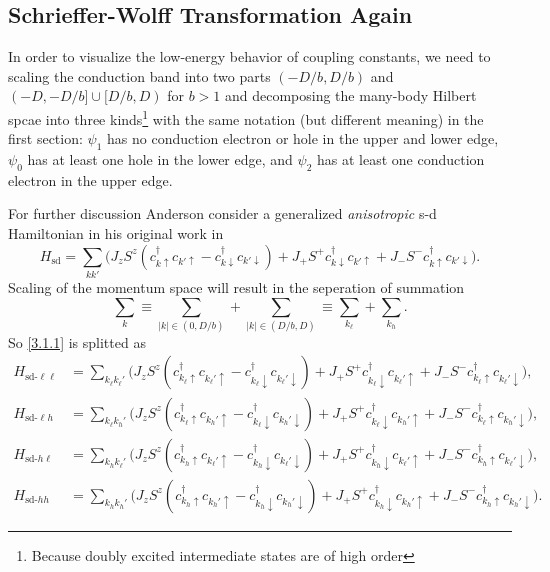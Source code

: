 \documentclass[aps,prx,superscriptaddress,onecolumn,preprintnumbers,nofootinbib,longbibliography]{revtex4-1}
\begin{document}
	\subsection{Schrieffer-Wolff Transformation Again}
		In order to visualize the low-energy behavior of coupling constants, we need to scaling the conduction band into two parts $(-D/b,D/b)$ and $(-D,-D/b]\cup[D/b,D)$ for $b>1$ and decomposing the many-body Hilbert spcae into three kinds\footnote{Because doubly excited intermediate states are of high order} with the same notation (but different meaning) in the first section: $\psi_1$ has no conduction electron or hole in the upper and lower edge, $\psi_0$ has at least one hole in the lower edge, and $\psi_2$ has at least one conduction electron in the upper edge.\par
		For further discussion Anderson consider a generalized \emph{anisotropic} s-d Hamiltonian in his original work in \cite{anderson1970poor}
		\begin{equation}\label{3.1.1}
			H_{\text{sd}}=\sum_{kk'}\bigg(J_zS^z(c_{k\uparrow}^\dagger c_{k'\uparrow}-c_{k\downarrow}^\dagger c_{k'\downarrow})+J_+S^+c_{k\downarrow}^\dagger c_{k'\uparrow}+J_-S^-c_{k\uparrow}^\dagger c_{k'\downarrow}\bigg).
		\end{equation}
		Scaling of the momentum space will result in the seperation of summation
		\begin{equation*}
			\sum_k\equiv\sum_{|k|\in(0,D/b)}+\sum_{|k|\in(D/b,D)}\equiv\sum_{k_\ell}+\sum_{k_h}.
		\end{equation*}
		So \eqref{3.1.1} is splitted as
		\begin{align*}
			H_{\text{sd-}\ell\ell}&=\sum_{k_\ell k_\ell'}\bigg(J_zS^z(c_{k_\ell\uparrow}^\dagger c_{k_\ell'\uparrow}-c_{k_\ell\downarrow}^\dagger c_{k_\ell'\downarrow})+J_+S^+c_{k_\ell\downarrow}^\dagger c_{k_\ell'\uparrow}+J_-S^-c_{k_\ell\uparrow}^\dagger c_{k_\ell'\downarrow}\bigg),\\
			H_{\text{sd-}\ell h}&=\sum_{k_\ell k_h'}\bigg(J_zS^z(c_{k_\ell\uparrow}^\dagger c_{k_h'\uparrow}-c_{k_\ell\downarrow}^\dagger c_{k_h'\downarrow})+J_+S^+c_{k_\ell\downarrow}^\dagger c_{k_h'\uparrow}+J_-S^-c_{k_\ell\uparrow}^\dagger c_{k_h'\downarrow}\bigg),\\
			H_{\text{sd-}h \ell}&=\sum_{k_h k_\ell'}\bigg(J_zS^z(c_{k_h\uparrow}^\dagger c_{k_\ell'\uparrow}-c_{k_h\downarrow}^\dagger c_{k_\ell'\downarrow})+J_+S^+c_{k_h\downarrow}^\dagger c_{k_\ell'\uparrow}+J_-S^-c_{k_h\uparrow}^\dagger c_{k_\ell'\downarrow}\bigg),\\
			H_{\text{sd-}h h}&=\sum_{k_h k_h'}\bigg(J_zS^z(c_{k_h\uparrow}^\dagger c_{k_h'\uparrow}-c_{k_h\downarrow}^\dagger c_{k_h'\downarrow})+J_+S^+c_{k_h\downarrow}^\dagger c_{k_h'\uparrow}+J_-S^-c_{k_h\uparrow}^\dagger c_{k_h'\downarrow}\bigg).
		\end{align*}
\end{document}
